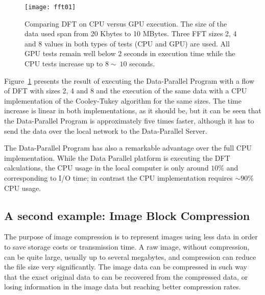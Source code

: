 \documentclass[conference]{IEEEtran}
\newcommand{\is}{250pt} \newcommand{\iss}{250pt}
\begin{document}
\begin{figure}[t]
\begin{center}
\texttt{[image: fft01]}
\end{center}
\caption{Comparing DFT on CPU versus GPU execution. The size of the data used
  span from 20 Kbytes to 10 MBytes. Three FFT sizes 2, 4 and 8 values in both
  types of tests (CPU and GPU) are used. All GPU tests remain well below 2
  seconds in execution time while the CPU tests increase up to $8 \sim\ 10$
  seconds.}
\label{fig:fft01}
\end{figure}

Figure~\ref{fig:fft01} presents the result of executing the Data-Parallel
Program with a flow of DFT with sizes 2, 4 and 8 and the execution of the same
data with a CPU implementation of the Cooley-Tukey algorithm for the same
sizes. The time increase is linear in both implementations, as it should be, but
it can be seen that the Data-Parallel Program is approximately five times
faster, although it has to send the data over the local network to the
Data-Parallel Server.

The Data-Parallel Program has also a remarkable advantage over the full CPU
implementation. While the Data Parallel platform is executing the DFT
calculations, the CPU usage in the local computer is only around $10\%$ and
corresponding to I/O time; in contrast the CPU implementation requires $\sim
90\%$ CPU usage.

\subsection{A second example: Image Block Compression}

\begin{figure*}[!t]
\centerline{
\hfil
{}
\hfil
{}}
\caption{Image compression from (a) original image to (c) compressed result. The
  block compression is done in the (b) luminance of the image, the colour layer
  is scaled down 1/4th from the full picture. Uncompressed size is $\sim
  770$ Kbytes, and compressed size is $\sim 80$ Kbytes}
\label{fig:compress}
\end{figure*}

The purpose of image compression is to represent images using less data in order
to save storage costs or transmission time.  A raw image, without compression,
can be quite large, usually up to several megabytes, and compression can reduce
the file size very significantly. The image data can be compressed in such way
that the exact original data to can be recovered from the compressed data, or
losing information in the image data but reaching better compression rates.
\end{document}
